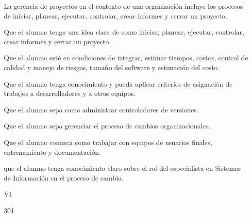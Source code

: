 \begin{syllabus}


\begin{justification}
La gerencia de proyectos en el contexto de una organización incluye los procesos de iniciar, planear, ejecutar, controlar, crear informes y cerrar un proyecto.
\end{justification}

\begin{goals}
\item Que el alumno tenga una idea clara de como iniciar, planear, ejecutar, controlar, crear informes y cerrar un proyecto.
\item Que el alumno esté en condiciones de integrar, estimar tiempos, costos, control de calidad y manejo de riesgos, tamaño del software y estimación del costo.
\item Que el alumno tenga conocimiento y pueda aplicar criterios de asignación de trabajos a desarrolladores y a otros equipos.
\item Que el alumno sepa como administrar controladores de versiones. 
\item Que el alumno sepa gerenciar el proceso de cambios organizacionales.
\item Que el alumno conozca como trabajar con equipos de usuarios finales, entrenamiento y documentación.
\item que el alumno tenga conocimiento claro sobre el rol del especialista en Sistemas de Información en el proceso de cambio.
\end{goals}

\begin{outcomes}{V1}
\end{outcomes}

\begin{unit}{\LUTWOOHEIGHTDef}{}{\LUTWOOHEIGHTBib}{30}{1}
   \begin{topics}
 	  	\item \TDSSEVENTopicTHREExSEVENxTWO
 	  	\item \TDSSEVENTopicTHREExSEVENxFOUR
 	  	\item \TDSSEVENTopicTHREExSEVENxSIX
 	  	\item \TDSSEVENTopicTHREExSEVENxSEVEN
 	  	\item \TDSSEVENTopicTHREExSEVENxONE
 	  	\item \TDSSEVENTopicTHREExSEVENxFIVE
 	  	\item \TDSSEVENTopicTHREExSEVENxTHREE
 	  	\item \TDSSEVENTopicTHREExSEVENxONETWO
 	  	\item \TDSSIXTopicTHREExSIXxTHREE
 	  	\item \TDSSEVENTopicTHREExSEVENxONETHREE
   \end{topics}
	\LUTWOOHEIGHTGoal
\end{unit}


\end{syllabus}
